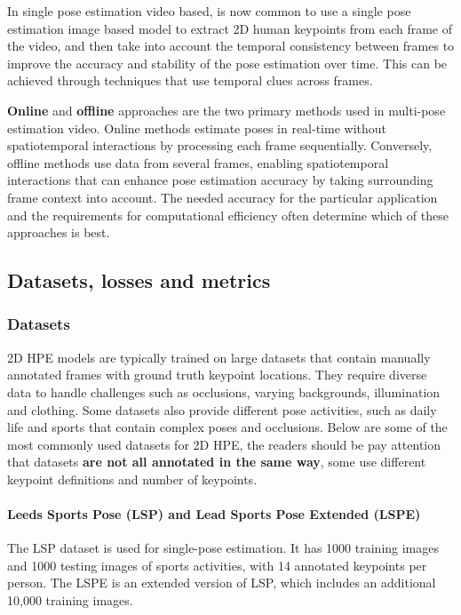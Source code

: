 In single pose estimation video based, is now common to use a single pose estimation image based model to extract 2D human keypoints from each frame of the video,
and then take into account the temporal consistency between frames to improve the accuracy and stability of the pose estimation over time. This can be achieved through techniques that use temporal
clues across frames.

\textbf{Online} and \textbf{offline} approaches are the two primary methods used in multi-pose estimation video. Online methods estimate poses in real-time without spatiotemporal interactions by processing each frame sequentially. 
Conversely, offline methods use data from several frames, enabling spatiotemporal interactions that can enhance pose estimation accuracy by taking surrounding frame context into account. The needed accuracy for the 
particular application and the requirements for computational efficiency often determine which of these approaches is best.
\newpage

\subsection{Datasets, losses and metrics}

\subsubsection{Datasets}
2D HPE models are typically trained on large datasets that contain manually annotated frames with ground truth keypoint locations. They require diverse
data to handle challenges such as occlusions, varying backgrounds, illumination and clothing. Some datasets also provide different pose activities, such as daily life
and sports that contain complex poses and occlusions.
Below are some of the most commonly used datasets for 2D HPE, the readers should be pay attention that datasets \textbf{are not all annotated in the same way}, some use different 
keypoint definitions and number of keypoints.

\paragraph{Leeds Sports Pose (LSP) and Lead Sports Pose Extended (LSPE)}
The LSP dataset \cite{johnson2010clustered} is used for single-pose estimation. It has 1000 training images and 1000 testing images of sports activities, with 14 annotated keypoints per person. 
The LSPE \cite{johnson2011learning} is an extended version of LSP, which includes an additional 10,000 training images.

